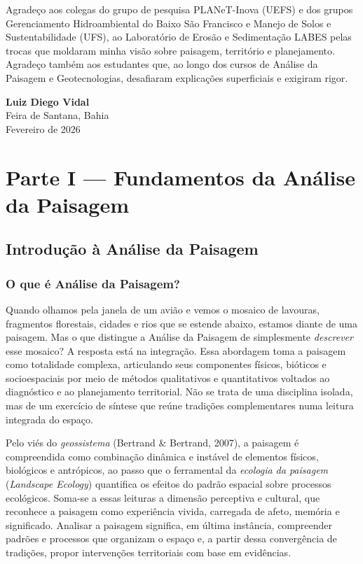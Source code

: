 \documentclass[
  portuguese,
  11pt,
  a4paper,
  open=any]{scrbook}
\begin{document}
Agradeço aos colegas do grupo de pesquisa PLANeT-Inova (UEFS) e dos
grupos Gerenciamento Hidroambiental do Baixo São Francisco e Manejo de
Solos e Sustentabilidade (UFS), ao Laboratório de Erosão e Sedimentação
LABES pelas trocas que moldaram minha visão sobre paisagem, território e
planejamento. Agradeço também aos estudantes que, ao longo dos cursos de
Análise da Paisagem e Geotecnologias, desafiaram explicações
superficiais e exigiram rigor.

\textbf{Luiz Diego Vidal}\\
Feira de Santana, Bahia\\
Fevereiro de 2026

\part{Parte I --- Fundamentos da Análise da Paisagem}

\chapter{Introdução à Análise da Paisagem}\label{sec-introducao}

\section{O que é Análise da
Paisagem?}\label{o-que-uxe9-anuxe1lise-da-paisagem}

Quando olhamos pela janela de um avião e vemos o mosaico de lavouras,
fragmentos florestais, cidades e rios que se estende abaixo, estamos
diante de uma paisagem. Mas o que distingue a Análise da Paisagem de
simplesmente \emph{descrever} esse mosaico? A resposta está na
integração. Essa abordagem toma a paisagem como totalidade complexa,
articulando seus componentes físicos, bióticos e socioespaciais por meio
de métodos qualitativos e quantitativos voltados ao diagnóstico e ao
planejamento territorial. Não se trata de uma disciplina isolada, mas de
um exercício de síntese que reúne tradições complementares numa leitura
integrada do espaço.

Pelo viés do \emph{geossistema} (Bertrand \& Bertrand, 2007), a paisagem
é compreendida como combinação dinâmica e instável de elementos físicos,
biológicos e antrópicos, ao passo que o ferramental da \emph{ecologia da
paisagem} (\emph{Landscape Ecology}) quantifica os efeitos do padrão
espacial sobre processos ecológicos. Soma-se a essas leituras a dimensão
perceptiva e cultural, que reconhece a paisagem como experiência vivida,
carregada de afeto, memória e significado. Analisar a paisagem
significa, em última instância, compreender padrões e processos que
organizam o espaço e, a partir dessa convergência de tradições, propor
intervenções territoriais com base em evidências.
\end{document}
